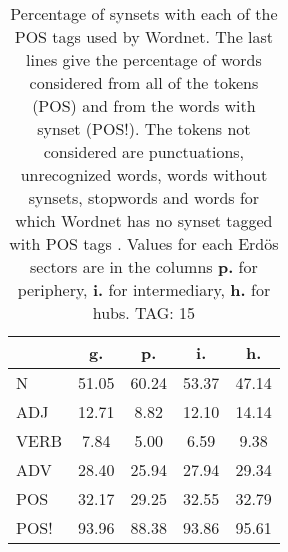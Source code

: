 \begin{table}[h!]
\begin{center}
\begin{tabular}{| l | c | c | c | c |}\hline
 & g. & p. & i. & h. \\\hline
N & 51.05  & 60.24  & 53.37  & 47.14 \\\hline
ADJ & 12.71  & 8.82  & 12.10  & 14.14 \\\hline
VERB & 7.84  & 5.00  & 6.59  & 9.38 \\\hline
ADV & 28.40  & 25.94  & 27.94  & 29.34 \\\hline
POS & 32.17  & 29.25  & 32.55  & 32.79 \\\hline
POS! & 93.96  & 88.38  & 93.86  & 95.61 \\\hline
\end{tabular}
\caption{Percentage of synsets with each of the POS tags used by Wordnet. The last lines give the percentage of words considered from all of the tokens (POS) and from the words with synset (POS!). The tokens not considered are punctuations, unrecognized words, words without synsets, stopwords and words for which Wordnet has no synset  tagged with POS tags . Values for each Erd\"os sectors are in the columns {{\bf p.}} for periphery, {{\bf i.}} for intermediary, {{\bf h.}} for hubs. TAG: 15}
\end{center}
\end{table}